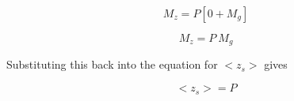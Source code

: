 \documentclass[11pt]{article}
\makeatletter
\newcommand{\boxspacing}{\kern\kvtcb@left@rule\kern\kvtcb@boxsep}
\newcommand{\prompt}[4]{
        {\ttfamily\llap{{\color{#2}[#3]:\hspace{3pt}#4}}\vspace{-\baselineskip}}
    }
\makeatother
\begin{document}
\begin{equation}
M_z = P \left[ 0 + M_g\right]
\end{equation}

\begin{equation}
M_z = P ~ M_g 
\end{equation}

Substituting this back into the equation for \(<z_s>\) gives

\begin{equation}
\boxed{<z_s> = P}
\end{equation}

    \begin{tcolorbox}[breakable, size=fbox, boxrule=1pt, pad at break*=1mm,colback=cellbackground, colframe=cellborder]
\prompt{In}{incolor}{ }{\boxspacing}
\begin{Verbatim}[commandchars=\\\{\}]

\end{Verbatim}
\end{tcolorbox}


    
    
    
\end{document}
